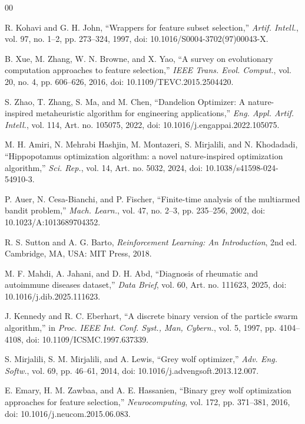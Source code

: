 \documentclass[journal]{IEEEtran}
\begin{document}
\begin{thebibliography}{00}

 R. Kohavi and G. H. John, ``Wrappers for feature subset selection,'' \textit{Artif. Intell.}, vol. 97, no. 1--2, pp. 273--324, 1997, doi: 10.1016/S0004-3702(97)00043-X.

 B. Xue, M. Zhang, W. N. Browne, and X. Yao, ``A survey on evolutionary computation approaches to feature selection,'' \textit{IEEE Trans. Evol. Comput.}, vol. 20, no. 4, pp. 606--626, 2016, doi: 10.1109/TEVC.2015.2504420.

 S. Zhao, T. Zhang, S. Ma, and M. Chen, ``Dandelion Optimizer: A nature-inspired metaheuristic algorithm for engineering applications,'' \textit{Eng. Appl. Artif. Intell.}, vol. 114, Art. no. 105075, 2022, doi: 10.1016/j.engappai.2022.105075.

 M. H. Amiri, N. Mehrabi Hashjin, M. Montazeri, S. Mirjalili, and N. Khodadadi, ``Hippopotamus optimization algorithm: a novel nature-inspired optimization algorithm,'' \textit{Sci. Rep.}, vol. 14, Art. no. 5032, 2024, doi: 10.1038/s41598-024-54910-3.

 P. Auer, N. Cesa-Bianchi, and P. Fischer, ``Finite-time analysis of the multiarmed bandit problem,'' \textit{Mach. Learn.}, vol. 47, no. 2--3, pp. 235--256, 2002, doi: 10.1023/A:1013689704352.

 R. S. Sutton and A. G. Barto, \textit{Reinforcement Learning: An Introduction}, 2nd ed. Cambridge, MA, USA: MIT Press, 2018.

 M. F. Mahdi, A. Jahani, and D. H. Abd, ``Diagnosis of rheumatic and autoimmune diseases dataset,'' \textit{Data Brief}, vol. 60, Art. no. 111623, 2025, doi: 10.1016/j.dib.2025.111623.

 J. Kennedy and R. C. Eberhart, ``A discrete binary version of the particle swarm algorithm,'' in \textit{Proc. IEEE Int. Conf. Syst., Man, Cybern.}, vol. 5, 1997, pp. 4104--4108, doi: 10.1109/ICSMC.1997.637339.

 S. Mirjalili, S. M. Mirjalili, and A. Lewis, ``Grey wolf optimizer,'' \textit{Adv. Eng. Softw.}, vol. 69, pp. 46--61, 2014, doi: 10.1016/j.advengsoft.2013.12.007.

 E. Emary, H. M. Zawbaa, and A. E. Hassanien, ``Binary grey wolf optimization approaches for feature selection,'' \textit{Neurocomputing}, vol. 172, pp. 371--381, 2016, doi: 10.1016/j.neucom.2015.06.083.


\end{thebibliography}
\end{document}
